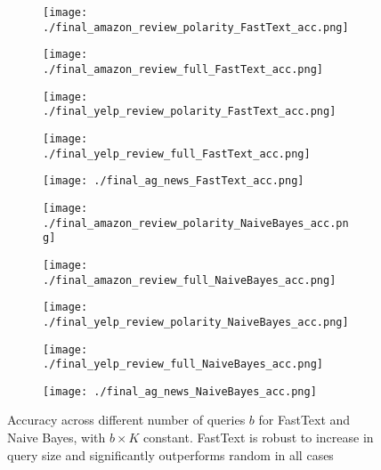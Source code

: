 \documentclass[11pt,a4paper]{article}
\begin{document}
\begin{figure*}[h!]
\begin{subfigure}[h]{0.33\linewidth}
\texttt{[image: ./final\_amazon\_review\_polarity\_FastText\_acc.png]}
\end{subfigure}
\begin{subfigure}[h]{0.33\linewidth}
\texttt{[image: ./final\_amazon\_review\_full\_FastText\_acc.png]}
\end{subfigure}
\begin{subfigure}[h]{0.33\linewidth}
\texttt{[image: ./final\_yelp\_review\_polarity\_FastText\_acc.png]}
\end{subfigure}
\begin{subfigure}[h]{0.33\linewidth}
\texttt{[image: ./final\_yelp\_review\_full\_FastText\_acc.png]}
\end{subfigure}
\begin{subfigure}[h]{0.33\linewidth}
\texttt{[image: ./final\_ag\_news\_FastText\_acc.png]}
\end{subfigure}
\begin{subfigure}[h]{0.33\linewidth}
\texttt{[image: ./final\_amazon\_review\_polarity\_NaiveBayes\_acc.png]}
\end{subfigure}
\begin{subfigure}[h]{0.33\linewidth}
\texttt{[image: ./final\_amazon\_review\_full\_NaiveBayes\_acc.png]}
\end{subfigure}
\begin{subfigure}[h]{0.33\linewidth}
\texttt{[image: ./final\_yelp\_review\_polarity\_NaiveBayes\_acc.png]}
\end{subfigure}
\begin{subfigure}[h]{0.33\linewidth}
\texttt{[image: ./final\_yelp\_review\_full\_NaiveBayes\_acc.png]}
\end{subfigure}
\begin{subfigure}[h]{0.33\linewidth}
\texttt{[image: ./final\_ag\_news\_NaiveBayes\_acc.png]}
\end{subfigure}
\caption{Accuracy across different number of queries $b$ for FastText and Naive Bayes, with  $b \times K$ constant. FastText is robust to increase in query size and significantly outperforms random in all cases} 
\label{fig:all_accuracies}
\end{figure*}
\end{document}

